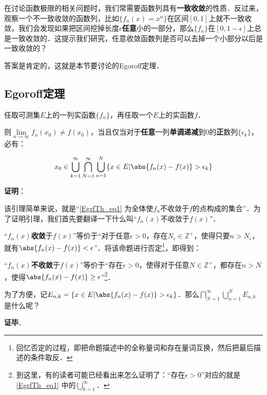 
在讨论函数极限的相关问题时，我们常需要函数列具有\textbf{一致收敛}的性质．反过来，观察一个不一致收敛的函数列，比如$\{f_n(x)=x^n\}$在区间$[0, 1]$上就不一致收敛，我们会发现如果把区间挖掉长度$\epsilon$\textbf{任意}小的一部分，那么$\{f_n\}$在$[0, 1-\epsilon]$上总是一致收敛的．这提示我们研究，任意收敛函数列是否可以去掉一个小部分以后是一致收敛的？

答案是肯定的，这就是本节要讨论的Egoroff定理．

\subsection{Egoroff定理}

\begin{lemma}{}
任取可测集$E$上的一列实函数$\{f_n\}$，再任取一个$E$上的实函数$f$．

则$\lim\limits_{n\to\infty}f_n(x_0)\neq f(x_0)$，当且仅当对于\textbf{任意}一列\textbf{单调递减}到$0$的\textbf{正}数列$\{\epsilon_k\}$，必有：

\begin{equation}\label{EgrfTh_eq1}
x_0\in\bigcup^\infty_{k=1}\bigcap^\infty_{N=1}\bigcup^N_{n=1} \{x\in E|\abs{f_n(x)-f(x)}>\epsilon_k\}
\end{equation}

\end{lemma}

\textbf{证明}：

该引理简单来说，就是“\autoref{EgrfTh_eq1} 为全体使$f_n$不收敛于$f$的点构成的集合”．为了证明引理，我们首先要翻译一下什么叫“$f_n(x)$不收敛于$f(x)$”．

“$f_n(x)$\textbf{收敛}于$f(x)$”等价于“对于任意$\epsilon>0$，存在$N_\epsilon\in\mathbb{Z}^+$，使得只要$n>N_\epsilon$，就有$\abs{f_n(x)-f(x)}<\epsilon$”．将该命题进行否定\footnote{回忆否定的过程，即把命题描述中的全称量词和存在量词互换，然后把最后描述的条件取反．}，即得到：

“$f_n(x)$\textbf{不收敛}于$f(x)$”等价于“存在$\epsilon>0$，使得对于任意$N\in\mathbb{Z}^+$，都存在$n>N$，使得$\abs{f_n(x)-f(x)}\geq\epsilon$”\footnote{到这里，有的读者可能已经看出来怎么证明了：“存在$\epsilon>0$”对应的就是\autoref{EgrfTh_eq1} 中的$\bigcup^\infty_{k=1}$．}．

为了方便，记$E_{n, k}=\{x\in E|\abs{f_n(x)-f(x)}>\epsilon_k\}$．那么$\bigcap^\infty_{N=1}\bigcup^N_{n=1} E_{n, k}$是什么呢？

\textbf{证毕}．








